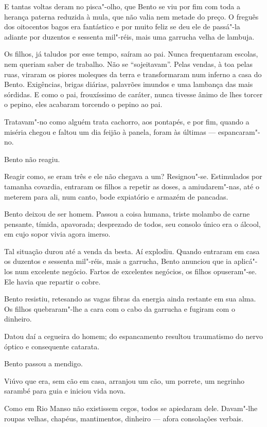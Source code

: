 E tantas voltas deram no pisca"-olho, que Bento se viu por fim com toda a
herança paterna reduzida à mula, que não valia nem metade do preço. O
freguês dos oitocentos bagos era fantástico e por muito feliz se deu ele
de passá"-la adiante por duzentos e sessenta mil"-réis, mais uma garrucha
velha de lambuja.

Os filhos, já taludos por esse tempo, saíram ao pai. Nunca frequentaram
escolas, nem queriam saber de trabalho. Não se ``sojeitavam''. Pelas
vendas, à toa pelas ruas, viraram os piores moleques da terra e
transformaram num inferno a casa do Bento. Exigências, brigas diárias,
palavrões imundos e uma lambança das mais sórdidas. E como o pai,
frouxíssimo de caráter, nunca tivesse ânimo de lhes torcer o pepino,
eles acabaram torcendo o pepino ao pai.

Tratavam"-no como alguém trata cachorro, aos pontapés, e por fim, quando
a miséria chegou e faltou um dia feijão à panela, foram às últimas ---
espancaram"-no.

Bento não reagiu.

Reagir como, se eram três e ele não chegava a um? Resignou"-se.
Estimulados por tamanha covardia, entraram os filhos a repetir as doses,
a amiudarem"-nas, até o meterem para ali, num canto, bode expiatório e
armazém de pancadas.

Bento deixou de ser homem. Passou a coisa humana, triste molambo de
carne pensante, tímida, apavorada; desprezado de todos, seu consolo
único era o álcool, em cujo sopor vivia agora imerso.

Tal situação durou até a venda da besta. Aí explodiu. Quando entraram em
casa os duzentos e sessenta mil"-réis, mais a garrucha, Bento anunciou
que ia aplicá"-los num excelente negócio. Fartos de excelentes negócios,
os filhos opuseram"-se. Ele havia que repartir o cobre.

Bento resistiu, retesando as vagas fibras da energia ainda restante em
sua alma. Os filhos quebraram"-lhe a cara com o cabo da garrucha e
fugiram com o dinheiro.

Datou daí a cegueira do homem; do espancamento resultou traumatismo do
nervo óptico e consequente catarata.

Bento passou a mendigo.

Viúvo que era, sem cão em casa, arranjou um cão, um porrete, um negrinho
sarambé para guia e iniciou vida nova.

Como em Rio Manso não existissem cegos, todos se apiedaram dele.
Davam"-lhe roupas velhas, chapéus, mantimentos, dinheiro --- afora
consolações verbais.

